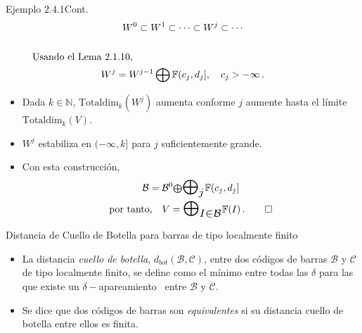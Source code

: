 \documentclass{beamer}
\def\matching{apareamiento}
\begin{document}
\begin{frame}{Ejemplo 2.4.1}{Cont.}
\begin{gather*}
W^0\subset W^{1}\subset \cdots \subset W^{j}\subset \cdots\\
\\
\mbox{Usando el Lema 2.1.10},\hspace{20em}\mbox{$\,$}\\
\,\hfill W^{j}=W^{j-1}\bigoplus \mathbb{F}(c_{j},d_{j}],\hspace{1em}c_{j}>-\infty\,.\hfill\,
\end{gather*}
\begin{itemize}
\item Dada $k\in \mathbb{N}$, $\mbox{Totaldim}_{k}(W^j)$ aumenta conforme $j$ aumente hasta el l\'imite $\mbox{Totaldim}_{k}(V)$.
\item $W^j$ estabiliza en $(-\infty,k]$ para $j$ suficientemente grande.
\item Con esta construcci\'on, 
\begin{gather*}
\mathcal{B}=\mathcal{B}^{0}\scalebox{.85}{\mbox{$\bigoplus$}}\scalebox{1.5}{\mbox{$\bigoplus_{j}$}}\mathbb{F}(c_{j},d_{j}]\\
\mbox{por tanto,}\hspace{1em}V=\scalebox{1.5}{\mbox{$\bigoplus_{I\in\mathcal{B}}$}}\mathbb{F}(I)\,.\hfill \qed
\end{gather*}
\end{itemize}
\end{frame}


\begin{frame}{Distancia de Cuello de Botella para barras de tipo localmente finito}
\scalebox{0.75}{(Sin cambio)}
\begin{itemize}
\item La distancia \emph{cuello de botella}, $d_{bot}\left( \mathcal{B},\mathcal{C}\right)$, entre dos c\'odigos de barras $\mathcal{B}$ y $\mathcal{C}$ de tipo localmente finito, se define como el m\'inimo entre todas las $\delta$ para las que existe un $\delta-$\matching~ entre $\mathcal{B}$ y $\mathcal{C}$.
\vspace{2em}
\item Se dice que dos c\'odigos de barras son \emph{equivalentes} si su distancia cuello de botella entre ellos es finita.
\end{itemize}
\end{frame}
\end{document}
